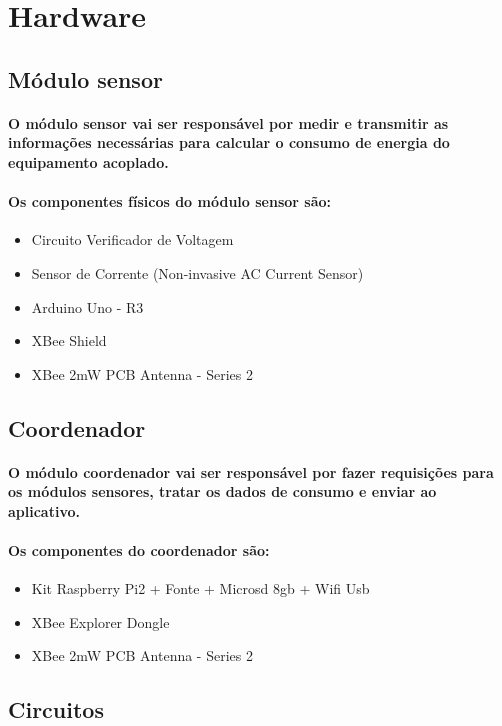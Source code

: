 
\section{Hardware}
\label{Sec:hardware}
\subsection{Módulo sensor}
\paragraph{
	O módulo sensor vai ser responsável por medir e transmitir as informações necessárias para calcular o consumo de energia do equipamento acoplado.
}
\paragraph{
	Os componentes físicos do módulo sensor são:
}
\begin{itemize}
\item Circuito Verificador de Voltagem
\item Sensor de Corrente (Non-invasive AC Current Sensor)
\item Arduino Uno - R3
\item XBee Shield
\item XBee 2mW PCB Antenna - Series 2
\end{itemize}

\subsection{Coordenador}
\paragraph{
	O módulo coordenador vai ser responsável por fazer requisições para os módulos sensores, tratar os dados de consumo e enviar ao aplicativo.
}
\paragraph{
	Os componentes do coordenador são:
}
\begin{itemize}
\item Kit Raspberry Pi2 + Fonte + Microsd 8gb + Wifi Usb
\item XBee Explorer Dongle
\item XBee 2mW PCB Antenna - Series 2
\end{itemize}

\subsection{Circuitos}
